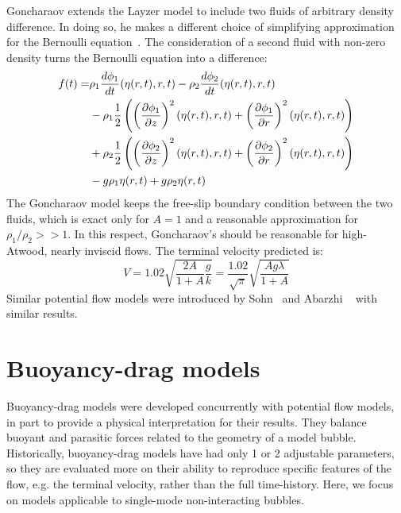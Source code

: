 Goncharaov extends the Layzer model to include two fluids of arbitrary density difference.
In doing so, he makes a different choice of simplifying approximation for the Bernoulli equation~\cite{Goncharov2002}.
The consideration of a second fluid with non-zero density turns the Bernoulli equation  into a difference:
\begin{equation} \label{eqn:GonBernoulli}
\begin{aligned}
f(t) = &   \rho_1 \frac{d \phi_1}{d t}(\eta(r,t), r, t) - \rho_2 \frac{d \phi_2}{d t}(\eta(r,t), r, t) \\
& - \rho_1 \frac{1}{2} \left(\left(\frac{\partial \phi_1}{\partial z}\right)^2(\eta(r,t), r, t) +\left(\frac{\partial \phi_1}{\partial r}\right)^2(\eta(r,t), r, t)\right) \\
& + \rho_2 \frac{1}{2} \left(\left(\frac{\partial \phi_2}{\partial z}\right)^2(\eta(r,t), r, t) +\left(\frac{\partial \phi_2}{\partial r}\right)^2(\eta(r,t), r, t)\right) \\
& - g \rho_1 \eta(r,t) + g \rho_2 \eta(r,t) 
\end{aligned}
\end{equation}
The Goncharaov model keeps the free-slip boundary condition between the two fluids, which is exact only for $A = 1$ and a reasonable approximation for $\rho_1 / \rho_2 >> 1$.
In this respect, Goncharaov's should be reasonable for high-Atwood, nearly inviscid flows.
The terminal velocity predicted is:
\begin{equation}
V = 1.02 \sqrt{\frac{2A }{1 + A} \frac{g}{k}} = \frac{1.02}{\sqrt{\pi}} \sqrt{\frac{A g \lambda}{1 + A}}
\end{equation}
Similar potential flow models were introduced by Sohn~\cite{Sohn2003} and Abarzhi \etal~\cite{Abarzhi2003} with similar results.

\section{Buoyancy-drag models}

Buoyancy-drag models were developed concurrently with potential flow models, in part to provide a physical interpretation for their results.
They balance buoyant and parasitic forces related to the geometry of a model bubble.
Historically, buoyancy-drag models have had only 1 or 2 adjustable parameters, so they are evaluated more on their ability to reproduce specific features of the flow, e.g. the terminal velocity, rather than the full time-history.
Here, we focus on models applicable to single-mode non-interacting bubbles.

